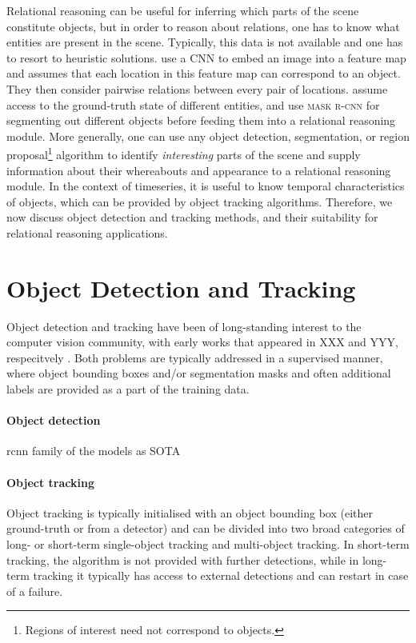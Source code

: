 	 Relational reasoning can be useful for inferring which parts of the scene constitute objects, but in order to reason about relations, one has to know what entities are present in the scene. 
	 Typically, this data is not available and one has to resort to heuristic solutions.
	 \cite{Santoro2017} use a \gls{CNN} to embed an image into a feature map and assumes that each location in this feature map can correspond to an object. 
	 They then consider pairwise relations between every pair of locations.
	 \cite{Battaglia2016,Baker2019tooluse} assume access to the ground-truth state of different entities,
	 and \cite{Yi2019cleverer} use \textsc{mask r-cnn} \citep{He2017maskrcnn} for segmenting out different objects before feeding them into a relational reasoning module.
	 More generally, one can use any object detection, segmentation, or region proposal\footnote{Regions of interest need not correspond to objects.} algorithm to identify \textit{interesting} parts of the scene and supply information about their whereabouts and appearance to a relational reasoning module.
	 In the context of timeseries, it is useful to know temporal characteristics of objects, which can be provided by object tracking algorithms.
	 Therefore, we now discuss object detection and tracking methods, and their suitability for relational reasoning applications.
	 
\section{Object Detection and Tracking}
\label{sec:object_det_track}

	Object detection and tracking have been of long-standing interest to the computer vision community, with early works that appeared in XXX and YYY, respecitvely \addref.
	Both problems are typically addressed in a supervised manner, where object bounding boxes and/or segmentation masks and often additional labels are provided as a part of the training data.
	\paragraph{Object detection}
	rcnn family of the models as SOTA
	
	\paragraph{Object tracking}
	Object tracking is typically initialised with an object bounding box (either ground-truth or from a detector) and can be divided into two broad categories of long- or short-term single-object tracking and multi-object tracking.
	In short-term tracking, the algorithm is not provided with further detections, while in long-term tracking it typically has access to external detections and can restart in case of a failure.
	

